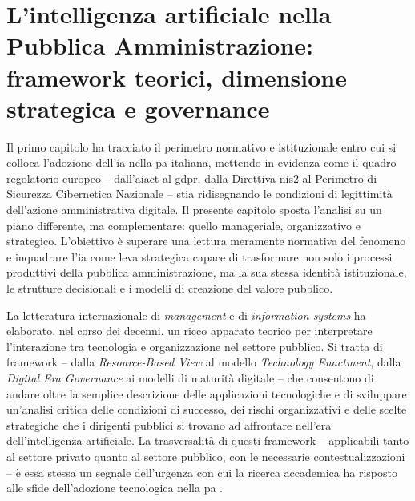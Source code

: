 
\chapter{L'intelligenza artificiale nella Pubblica Amministrazione: framework teorici, dimensione strategica e governance}
\label{cap:cap2}

Il primo capitolo ha tracciato il perimetro normativo e istituzionale entro cui si colloca l'adozione dell'\gls{ia} nella \gls{pa} italiana, mettendo in evidenza come il quadro regolatorio europeo -- dall'\gls{aiact} al \gls{gdpr}, dalla Direttiva \gls{nis2} al Perimetro di Sicurezza Cibernetica Nazionale -- stia ridisegnando le condizioni di legittimità dell'azione amministrativa digitale. Il presente capitolo sposta l'analisi su un piano differente, ma complementare: quello manageriale, organizzativo e strategico. L'obiettivo è superare una lettura meramente normativa del fenomeno e inquadrare l'\gls{ia} come leva strategica capace di trasformare non solo i processi produttivi della pubblica amministrazione, ma la sua stessa identità istituzionale, le strutture decisionali e i modelli di creazione del valore pubblico.

La letteratura internazionale di \textit{management} e di \textit{information systems} ha elaborato, nel corso dei decenni, un ricco apparato teorico per interpretare l'interazione tra tecnologia e organizzazione nel settore pubblico. Si tratta di framework -- dalla \textit{Resource-Based View} al modello \textit{Technology Enactment}, dalla \textit{Digital Era Governance} ai modelli di maturità digitale -- che consentono di andare oltre la semplice descrizione delle applicazioni tecnologiche e di sviluppare un'analisi critica delle condizioni di successo, dei rischi organizzativi e delle scelte strategiche che i dirigenti pubblici si trovano ad affrontare nell'era dell'intelligenza artificiale. La trasversalità di questi framework -- applicabili tanto al settore privato quanto al settore pubblico, con le necessarie contestualizzazioni -- è essa stessa un segnale dell'urgenza con cui la ricerca accademica ha risposto alle sfide dell'adozione tecnologica nella \gls{pa} \parencite{Madan2023}.

